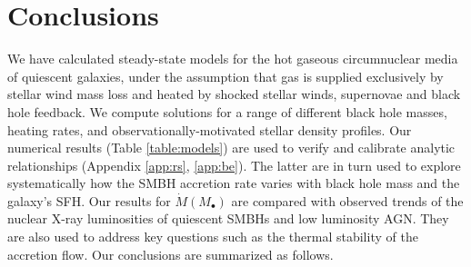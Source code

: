 \documentclass[usenatbib,fleqn]{mn2e}
\newcommand{\Mbh}[1][]{M_{\bullet#1}}
\begin{document}
\section{Conclusions}
\label{sec:conclusions}

We have calculated steady-state models for the hot gaseous circumnuclear media of quiescent galaxies, under the assumption that gas is supplied exclusively by stellar wind mass loss and heated by shocked stellar winds, supernovae and black hole feedback.  We compute solutions for a range of different black hole masses, heating rates, and observationally-motivated stellar density profiles.  Our numerical results (Table \ref{table:models}) are used to verify and calibrate analytic relationships (Appendix \ref{app:rs}, \ref{app:be}).  The latter are in turn used to explore systematically how the SMBH accretion rate varies with black hole mass and the galaxy's SFH.  Our results for $\dot{M}(\Mbh)$ are compared with observed trends of the nuclear X-ray luminosities of quiescent SMBHs and low luminosity AGN.  They are also used to address key questions such as the thermal stability of the accretion flow.  Our conclusions are summarized as follows.
\end{document}
